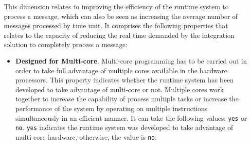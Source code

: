 This dimension relates to improving the efficiency of the runtime system to process a message, which can also be seen as increasing the average number of messages processed by time unit. It comprises the following properties that relates to the capacity of reducing the real time demanded by the integration solution to completely process a message:
\begin{itemize} 
\item \textbf{Designed for Multi-core}. Multi-core programming has to be carried out in order to take full advantage of multiple cores available in the hardware processors. This property indicates whether the runtime system has been developed to take advantage of multi-core or not. Multiple cores work together to increase the capability of process multiple tasks or increase the performance of the system by operating on multiple instructions simultaneously in an efficient manner. It can take the following values: \texttt{yes} or \texttt{no}. \texttt{yes} indicates the runtime system was developed to take advantage of multi-core hardware, otherwise, the value is \texttt{no}.


\end{itemize}

